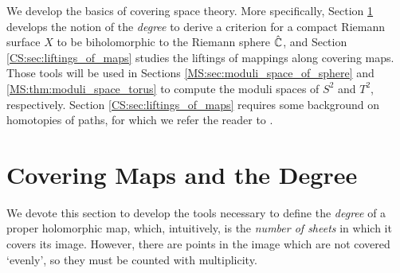 \documentclass[../Moduli_Spaces_of_Riemann_Surfaces.tex]{subfiles}
\begin{document}
    We develop the basics of covering space theory. More specifically, Section \ref{CS:sec:covering_maps_degree} develops the notion of the \textit{degree} to derive a criterion for a compact Riemann surface $X$ to be biholomorphic to the Riemann sphere $\hat{\mathbb{C}}$, and Section \ref{CS:sec:liftings_of_maps} studies the liftings of mappings along covering maps. Those tools will be used in Sections \ref{MS:sec:moduli_space_of_sphere} and \ref{MS:thm:moduli_space_torus} to compute the moduli spaces of $S^2$ and $T^2$, respectively. Section \ref{CS:sec:liftings_of_maps} requires some background on homotopies of paths, for which we refer the reader to \cite[][Chapter 1]{hatcher}.
    \section{Covering Maps and the Degree}\label{CS:sec:covering_maps_degree}
    We devote this section to develop the tools necessary to define the \textit{degree} of a proper holomorphic map, which, intuitively, is the \textit{number of sheets} in which it covers its image. However, there are points in the image which are not covered `evenly', so they must be counted with multiplicity.
\end{document}
